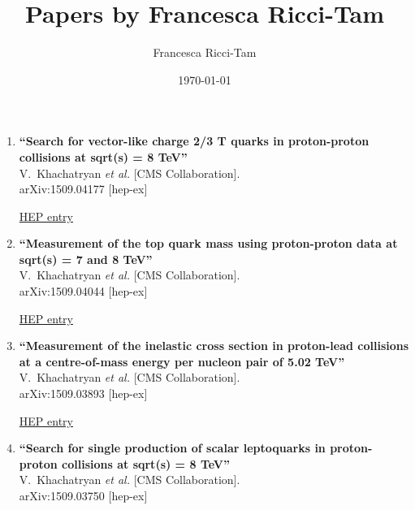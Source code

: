\documentclass{article}
\begin{document}
\title{Papers by Francesca Ricci-Tam}
\author{Francesca Ricci-Tam}
\date{\today}
\maketitle
\begin{enumerate}


\item%
{\bf ``Search for vector-like charge 2/3 T quarks in proton-proton collisions at sqrt(s) = 8 TeV''}
  \\{}V.~Khachatryan {\it et al.} [CMS Collaboration].
  \\{}arXiv:1509.04177 [hep-ex]
  
\href{http://inspirehep.net/record/1393276}{HEP entry}



\item%
{\bf ``Measurement of the top quark mass using proton-proton data at sqrt(s) = 7 and 8 TeV''}
  \\{}V.~Khachatryan {\it et al.} [CMS Collaboration].
  \\{}arXiv:1509.04044 [hep-ex]
  
\href{http://inspirehep.net/record/1393269}{HEP entry}


\item%
{\bf ``Measurement of the inelastic cross section in proton-lead collisions at a centre-of-mass energy per nucleon pair of 5.02 TeV''}
  \\{}V.~Khachatryan {\it et al.} [CMS Collaboration].
  \\{}arXiv:1509.03893 [hep-ex]
  
\href{http://inspirehep.net/record/1393261}{HEP entry}



\item%
{\bf ``Search for single production of scalar leptoquarks in proton-proton collisions at sqrt(s) = 8 TeV''}
  \\{}V.~Khachatryan {\it et al.} [CMS Collaboration].
  \\{}arXiv:1509.03750 [hep-ex]
  

\end{enumerate}
\end{document}
